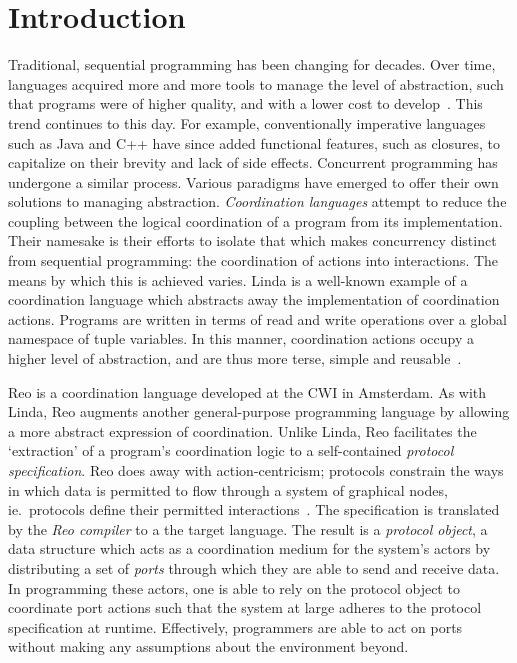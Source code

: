 \chapter{Introduction}	


Traditional, sequential programming has been changing for decades. Over time, languages acquired more and more tools to manage the level of abstraction, such that programs were of higher quality, and with a lower cost to develop~\cite{shaw1984abstraction}. This trend continues to this day. For example, conventionally imperative languages such as Java and C++ have since added functional features, such as closures, to capitalize on their brevity and lack of side effects. Concurrent programming has undergone a similar process. Various paradigms have emerged to offer their own solutions to managing abstraction. \textit{Coordination languages} attempt to reduce the coupling between the logical coordination of a program from its implementation. Their namesake is their efforts to isolate that which makes concurrency distinct from sequential programming: the coordination of actions into interactions. The means by which this is achieved varies. Linda is a well-known example of a coordination language which abstracts away the implementation of coordination actions. Programs are written in terms of read and write operations over a global namespace of tuple variables. In this manner, coordination actions occupy a higher level of abstraction, and are thus more terse, simple and reusable~\cite{gelernter1985generative}.


Reo is a coordination language developed at the CWI in Amsterdam. As with Linda, Reo augments another general-purpose programming language by allowing a more abstract expression of coordination. Unlike Linda, Reo facilitates the `extraction' of a program's coordination logic to a self-contained \textit{protocol specification}. Reo does away with action-centricism; protocols constrain the ways in which data is permitted to flow through a system of graphical nodes, ie.\ protocols define their permitted interactions~\cite{arbab2005abstract}. The specification is translated by the \textit{Reo compiler} to a the target language. The result is a \textit{protocol object}, a data structure which acts as a coordination medium for the system's actors by distributing a set of \textit{ports} through which they are able to send and receive data. In programming these actors, one is able to rely on the protocol object to coordinate port actions such that the system at large adheres to the protocol specification at runtime. Effectively, programmers are able to act on ports without making any assumptions about the environment beyond.

